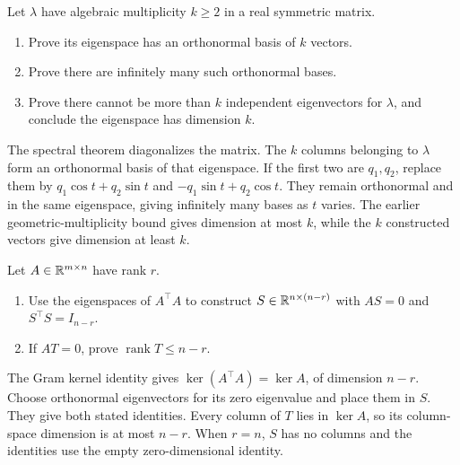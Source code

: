 \begin{problem}\label{ex:09:multiplicity}
Let \(\lambda\) have algebraic multiplicity \(k\geqslant2\) in a real
symmetric matrix.
\begin{enumerate}
\item Prove its eigenspace has an orthonormal basis of \(k\) vectors.
\item Prove there are infinitely many such orthonormal bases.
\item Prove there cannot be more than \(k\) independent eigenvectors
for \(\lambda\), and conclude the eigenspace has dimension \(k\).
\end{enumerate}
\end{problem}
\begin{solution}
The spectral theorem diagonalizes the matrix. The \(k\) columns belonging
to \(\lambda\) form an orthonormal basis of that eigenspace.
If the first two are \(q_1,q_2\), replace them by
\(q_1\cos t+q_2\sin t\) and \(-q_1\sin t+q_2\cos t\).
They remain orthonormal and in the same eigenspace, giving infinitely
many bases as \(t\) varies.
The earlier geometric-multiplicity bound gives dimension at most \(k\),
while the \(k\) constructed vectors give dimension at least \(k\).
\end{solution}

\begin{problem}\label{ex:09:null-basis}
Let \(A\in\mathbb R^{m\times n}\) have rank \(r\).
\begin{enumerate}
\item Use the eigenspaces of \(A^\top A\) to construct
\(S\in\mathbb R^{n\times(n-r)}\) with \(AS=0\) and \(S^\top S=I_{n-r}\).
\item If \(AT=0\), prove \(\operatorname{rank}T\leqslant n-r\).
\end{enumerate}
\end{problem}
\begin{solution}
The Gram kernel identity gives
\(\ker(A^\top A)=\ker A\), of dimension \(n-r\).
Choose orthonormal eigenvectors for its zero eigenvalue and place them
in \(S\). They give both stated identities.
Every column of \(T\) lies in \(\ker A\), so its column-space dimension
is at most \(n-r\).
When \(r=n\), \(S\) has no columns and the identities use the empty
zero-dimensional identity.
\end{solution}

